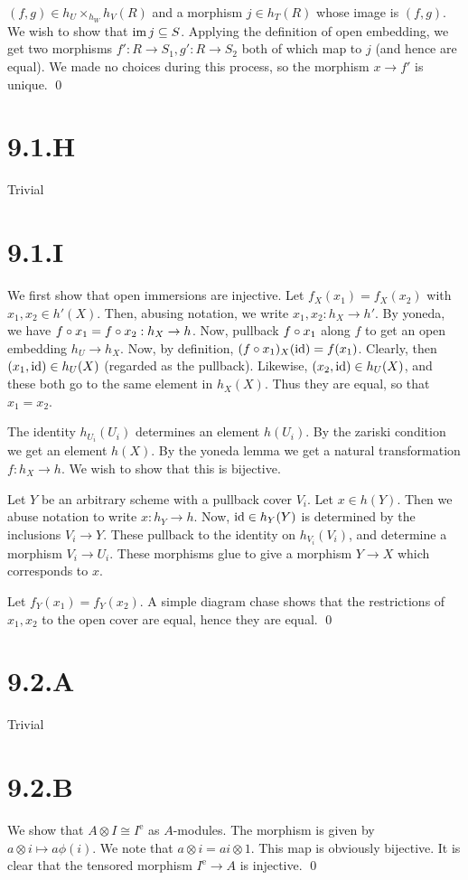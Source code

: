 \documentclass{article}
\begin{document}
$(f,g) \in h_U\times_{h_W}h_V(R)$ and a morphism $j \in h_T(R)$ whose image is
$(f, g)$. We wish to show that $\operatorname{im} j \subseteq S$. Applying
the definition of open embedding, we get two morphisms $f': R \to S_1, g': R \to S_2$
both of which map to $j$ (and hence are equal). We made no
choices during this process, so the morphism $x \to f'$ is unique.
\qed

\section{9.1.H}
Trivial

\section{9.1.I}
We first show that open immersions are injective. Let $f_X(x_1)=f_X(x_2)$
with $x_1, x_2 \in h'(X)$. Then, abusing notation, we write
$x_1, x_2: h_X \to h'$. By yoneda, we have $f\circ x_1=f\circ x_2: h_X \to h$. Now,
pullback $f\circ x_1$ along $f$ to get an open
embedding $h_U \to h_X$. Now, by definition, $(f \circ x_1)_X(\operatorname{id})=f(x_1)$.
Clearly, then $(x_1,\operatorname{id}) \in h_U(X)$ (regarded as the pullback). Likewise,
$(x_2, \operatorname{id}) \in h_U(X)$, and these both go to the same element in
$h_X(X)$. Thus they are equal, so that $x_1 = x_2$.

The identity $h_{U_i}(U_i)$ determines an element
$h(U_i)$. By the zariski condition we get an element
$h(X)$. By the yoneda lemma we get a natural transformation
$f: h_X \to h$. We wish to show that this is bijective.

Let $Y$ be an arbitrary scheme with a pullback cover
$V_i$. Let $x \in h(Y)$. Then we abuse notation to
write $x: h_Y \to h$. Now, $\operatorname{id} \in h_Y(Y)$ is determined by the
inclusions $V_i \to Y$. These pullback to the identity on
$h_{V_i}(V_i)$, and determine a morphism $V_i \to U_i$. These
morphisms glue to give a morphism $Y \to X$ which corresponds to
$x$.

Let $f_Y(x_1)=f_Y(x_2)$. A simple diagram chase shows that the restrictions
of $x_1, x_2$ to the open cover are equal, hence they are equal.
\qed

\section{9.2.A}
Trivial

\section{9.2.B}
We show that $A \otimes I \cong I^{\text{e}}$ as $A$-modules. The
morphism is given by $a \otimes i \mapsto a\phi(i)$. We note that
$a \otimes i = ai \otimes 1$. This map is obviously bijective. It is clear that the
tensored morphism $I^{\text{e}} \to A$ is injective. \qed
\end{document}
